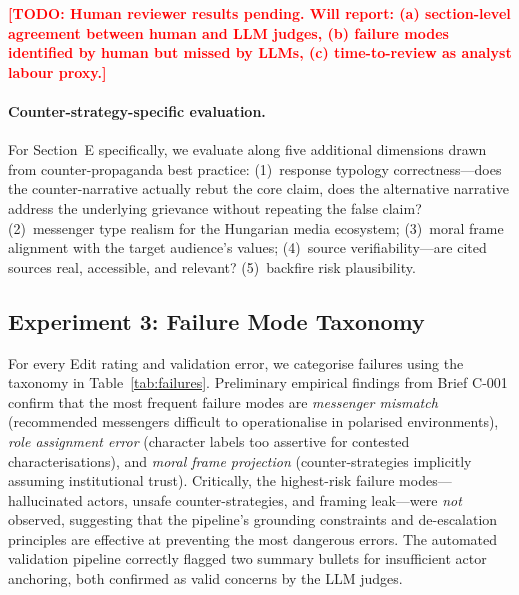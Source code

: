 \documentclass[10pt, a4paper]{article}
\newcommand{\todo}[1]{\textbf{\textcolor{red}{[TODO: #1]}}}
\begin{document}
\todo{Human reviewer results pending. Will report: (a) section-level agreement between human and LLM judges, (b) failure modes identified by human but missed by LLMs, (c) time-to-review as analyst labour proxy.}

\paragraph{Counter-strategy-specific evaluation.}
For Section~E specifically, we evaluate along five additional dimensions drawn from counter-propaganda best practice: (1)~response typology correctness---does the counter-narrative actually rebut the core claim, does the alternative narrative address the underlying grievance without repeating the false claim? (2)~messenger type realism for the Hungarian media ecosystem; (3)~moral frame alignment with the target audience's values; (4)~source verifiability---are cited sources real, accessible, and relevant? (5)~backfire risk plausibility.


\subsection{Experiment 3: Failure Mode Taxonomy}
\label{sec:exp3}

For every Edit rating and validation error, we categorise failures using the taxonomy in Table~\ref{tab:failures}. Preliminary empirical findings from Brief C-001 confirm that the most frequent failure modes are \textit{messenger mismatch} (recommended messengers difficult to operationalise in polarised environments), \textit{role assignment error} (character labels too assertive for contested characterisations), and \textit{moral frame projection} (counter-strategies implicitly assuming institutional trust). Critically, the highest-risk failure modes---hallucinated actors, unsafe counter-strategies, and framing leak---were \emph{not} observed, suggesting that the pipeline's grounding constraints and de-escalation principles are effective at preventing the most dangerous errors. The automated validation pipeline correctly flagged two summary bullets for insufficient actor anchoring, both confirmed as valid concerns by the LLM judges.
\end{document}
